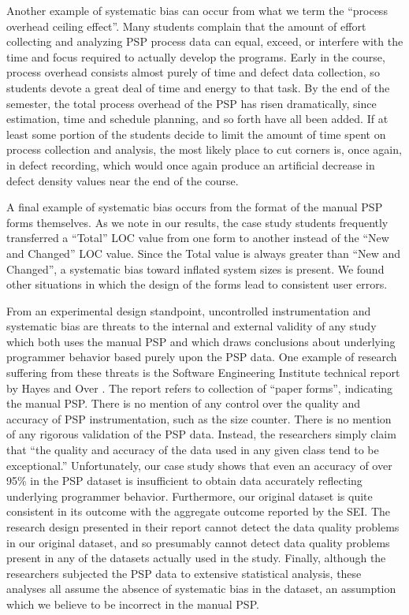 Another example of systematic bias can occur from what we term the ``process
overhead ceiling effect''.  Many students complain that the amount of
effort collecting and analyzing PSP process data can equal, exceed, or
interfere with the time and focus required to actually develop the
programs.  Early in the course, process overhead consists almost purely
of time and defect data collection, so students devote a great deal
of time and energy to that task.  By the end of the semester, the
total process overhead of the PSP has risen dramatically, since estimation,
time and schedule planning, and so forth have all been added. If 
at least some portion of the students decide to limit the amount of 
time spent on process collection and analysis, the most likely place
to cut corners is, once again, in defect recording, which would 
once again produce an artificial decrease in defect density values near the 
end of the course.

A final example of systematic bias occurs from the format of the manual PSP
forms themselves. As we note in our results, the case study students
frequently transferred a ``Total'' LOC value from one form to another
instead of the ``New and Changed'' LOC value.  Since the Total value is
always greater than ``New and Changed'', a systematic bias toward inflated
system sizes is present. We found other situations in which the design
of the forms lead to consistent user errors. 

From an experimental design standpoint, uncontrolled instrumentation and
systematic bias are threats to the internal and external validity of any
study which both uses the manual PSP and which draws conclusions about
underlying programmer behavior based purely upon the PSP data.  One example
of research suffering from these threats is the Software Engineering
Institute technical report by Hayes and Over \cite{Hayes97}.  The report
refers to collection of ``paper forms'', indicating the manual PSP.  There
is no mention of any control over the quality and accuracy of PSP
instrumentation, such as the size counter.  There is no mention of any
rigorous validation of the PSP data. Instead, the researchers simply claim
that ``the quality and accuracy of the data used in any given class tend to
be exceptional.''  Unfortunately, our case study shows that even an
accuracy of over 95\% in the PSP dataset is insufficient to obtain data
accurately reflecting underlying programmer behavior. Furthermore, our
original dataset is quite consistent in its outcome with the 
aggregate outcome reported by the SEI.  The research design presented
in their report cannot detect the data quality problems in our original
dataset, and so presumably cannot detect data quality problems present in
any of the datasets actually used in the study. Finally, although the
researchers subjected the PSP data to extensive statistical analysis, these
analyses all assume the absence of systematic bias in the dataset, an
assumption which we believe to be incorrect in the manual PSP.


